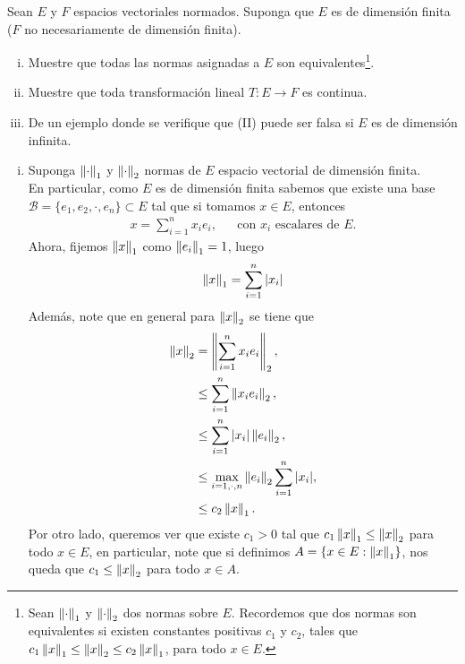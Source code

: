 \begin{homeworkProblem}
  Sean $E$ y $F$ espacios vectoriales normados. Suponga que $E$ es de dimensión finita ($F$ no necesariamente de dimensión finita).
  \begin{enumerate}[(i)]
    \item Muestre que todas las normas asignadas a $E$ son equivalentes\footnote{Sean $\left\|\cdot\right\|_{1}$ y $\left\|\cdot\right\|_{2}$ dos normas sobre $E$. Recordemos que dos normas son equivalentes si existen constantes positivas $c_1$ y $c_2$, tales que $c_1\left\|x\right\|_{1}\leq \left\|x\right\|_{2}\leq c_2\left\|x\right\|_{1}$, para todo $x\in E$.}.
    \item Muestre que toda transformación lineal $T:E\to F$ es continua.
    \item De un ejemplo donde se verifique que (II) puede ser falsa si $E$ es de dimensión infinita. 
  \end{enumerate}
  \begin{solution}
    \begin{enumerate}[(i)]
      \item Suponga $\left\|\cdot\right\|_{1}$ y $\left\|\cdot\right\|_{2}$ normas de $E$ espacio vectorial de dimensión finita.\\
        En particular, como $E$ es de dimensión finita sabemos que existe una base $\mathcal{B}=\{e_1,e_2,\cdot,e_n\}\subset E$ tal que si tomamos $x\in E$, entonces
        \begin{align*}
          x=\sum_{i=1}^{n}x_ie_i, &&\text{con $x_i$ escalares de $E$.}
        \end{align*}
        Ahora, fijemos $\left\|x\right\|_1$ como $\left\|e_i\right\|_1=1$, luego 
        \begin{align*}
          \left\|x\right\|_{1}=\sum_{i=1}^{n}|x_i|
        \end{align*}
        Además, note que en general para $\left\|x\right\|_2$ se tiene que
        \begin{align*}
          \left\|x\right\|_{2}&=\left\|\sum_{i=1}^{n}x_ie_i\right\|_{2},\\
          &\leq \sum_{i=1}^{n}\left\|x_ie_{i}\right\|_{2},\\
          &\leq \sum_{i=1}^{n}|x_i|\left\|e_i\right\|_{2},\\
          &\leq \max_{i=1,\cdot,n}\left\|e_i\right\|_{2}\sum_{i=1}^{n}|x_i|,\\
          &\leq c_{2}\left\|x\right\|_{1}.
        \end{align*}
        Por otro lado, queremos ver que existe $c_1>0$ tal que $c_1\left\|x\right\|_{1}\leq \left\|x\right\|_{2}$ para todo $x\in E$, en particular, note que si definimos $A=\{x\in E: \left\|x\right\|_{1}\}$, nos queda que $c_1\leq \left\|x\right\|_{2}$ para todo $x\in A$.\\

\end{enumerate}
\end{solution}
\end{homeworkProblem}

